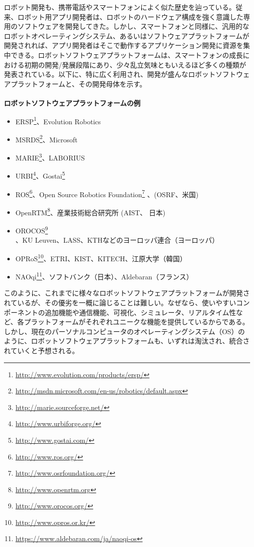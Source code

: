 ロボット開発も、携帯電話やスマートフォンによく似た歴史を辿っている。従来、ロボット用アプリ開発者は、ロボットのハードウェア構成を強く意識した専用のソフトウェアを開発してきた。しかし、スマートフォンと同様に、汎用的なロボットオペレーティングシステム、あるいはソフトウェアプラットフォームが開発されれば、アプリ開発者はそこで動作するアプリケーション開発に資源を集中できる。ロボットソフトウェアプラットフォームは、スマートフォンの成長における初期の開発/発展段階にあり、少々乱立気味ともいえるほど多くの種類が発表されている。以下に、特に広く利用され、開発が盛んなロボットソフトウェアプラットフォームと、その開発母体を示す。\\
\\
\textbf{ロボットソフトウェアプラットフォームの例}
\begin{itemize}[leftmargin=*]
\item ERSP\footnote{\url{http://www.evolution.com/products/ersp/}}、Evolution Robotics
\item MSRDS\footnote{\url{http://msdn.microsoft.com/en-us/robotics/default.aspx}}、Microsoft
\item MARIE\footnote{\url{http://marie.sourceforge.net/}}、LABORIUS
\item URBI\footnote{\url{http://www.urbiforge.org/}}、Gostai\footnote{\url{http://www.gostai.com/}}
\item ROS\footnote{\url{http://www.ros.org/}}、Open Source Robotics Foundation\footnote{\url{http://www.osrfoundation.org/}} 、(OSRF、米国)
\item OpenRTM\footnote{\url{http://www.openrtm.org}}、産業技術総合研究所 (AIST、 日本)
\item OROCOS\footnote{\url{http://www.orocos.org/}}、KU Leuven、LASS、KTHなどのヨーロッパ連合（ヨーロッパ）
\item OPRoS\footnote{\url{http://www.opros.or.kr/}}、ETRI、KIST、KITECH、江原大学（韓国）
\item NAOqi\footnote{\url{https://www.aldebaran.com/ja/naoqi-os}}、ソフトバンク（日本）、Aldebaran（フランス）
\end{itemize}
\vspace{1\baselineskip}
このように、これまでに様々なロボットソフトウェアプラットフォームが開発されているが、その優劣を一概に論じることは難しい。なぜなら、使いやすいコンポーネントの追加機能や通信機能、可視化、シミュレータ、リアルタイム性など、各プラットフォームがそれぞれユニークな機能を提供しているからである。しかし、現在のパーソナルコンピュータのオペレーティングシステム（OS）のように、ロボットソフトウェアプラットフォームも、いずれは淘汰され、統合されていくと予想される。
